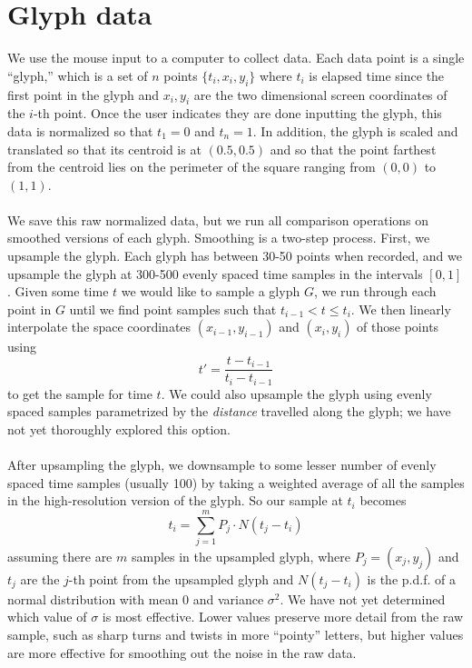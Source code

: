 \documentclass[journal]{IEEEtran}
\begin{document}
\section{Glyph data}
We use the mouse input to a computer to collect data. Each data point is a single ``glyph,'' which is a set of $n$ points $\{t_i,x_i,y_i\}$ where $t_i$ is elapsed time since the first point in the glyph and $x_i,y_i$ are the two dimensional screen coordinates of the $i$-th point. Once the user indicates they are done inputting the glyph, this data is normalized so that $t_1 = 0$ and $t_n = 1$. In addition, the glyph is scaled and translated so that its centroid is at $(0.5,0.5)$ and so that the point farthest from the centroid lies on the perimeter of the square ranging from $(0,0)$ to $(1,1)$.\\\\
We save this raw normalized data, but we run all comparison operations on smoothed versions of each glyph. Smoothing is a two-step process. First, we upsample the glyph. Each glyph has between 30-50 points when recorded, and we upsample the glyph at 300-500 evenly spaced time samples in the intervals $[0,1]$. Given some time $t$ we would like to sample a glyph $G$, we run through each point in $G$ until we find point samples such that $t_{i-1} < t \leq t_i$. We then linearly interpolate the space coordinates $(x_{i-1},y_{i-1})$ and $(x_i,y_i)$ of those points using
\[ t' = \dfrac{t - t_{i-1}}{t_i-t_{i-1}} \]
to get the sample for time $t$. We could also upsample the glyph using evenly spaced samples parametrized by the \emph{distance} travelled along the glyph; we have not yet thoroughly explored this option. \\\\
After upsampling the glyph, we downsample to some lesser number of evenly spaced time samples (usually 100) by taking a weighted average of all the samples in the high-resolution version of the glyph. So our sample at $t_i$ becomes 
\[ t_i = \sum_{j=1}^m P_j\cdot N(t_j - t_i) \]
assuming there are $m$ samples in the upsampled glyph, where $P_j = (x_j,y_j)$ and $t_j$ are the $j$-th point from the upsampled glyph and $N(t_j-t_i)$ is the p.d.f. of a normal distribution with mean 0 and variance $\sigma^2$. We have not yet determined which value of $\sigma$ is most effective. Lower values preserve more detail from the raw sample, such as sharp turns and twists in more ``pointy'' letters, but higher values are more effective for smoothing out the noise in the raw data.
\end{document}

